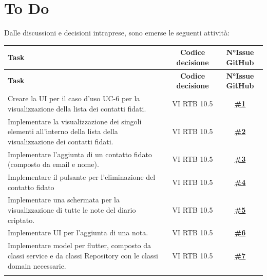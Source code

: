 \documentclass[a4paper,12pt]{article}
\newcommand{\ignoreglossary}{}
\begin{document}
\section{To Do}
Dalle discussioni e decisioni intraprese, sono emerse le seguenti attività:
\small
\renewcommand{\arraystretch}{1.2}
\begin{longtable}{|>{\raggedright\arraybackslash}p{}|c|c|}
\hline
\rowcolor{gray!60}
\textbf{Task} & \textbf{Codice decisione} & \textbf{N°Issue GitHub} \\
\hline
\endfirsthead
\hline
\rowcolor{gray!60}
\textbf{Task} & \textbf{Codice decisione} & \textbf{N°Issue GitHub} \\
\hline
\endhead
\endfoot
\hline
\endlastfoot
\rowcolor{white}
Creare la UI per il caso d'uso UC-6 per la visualizzazione della lista dei contatti fidati. & VI \ignoreglossary{RTB} 10.5 & \href{https://github.com/SWE-BitByBit/project-PoC/issues/1}{\textbf{\#1}} \\
\hline
\rowcolor{gray!20}
Implementare la visualizzazione dei singoli elementi all'interno della lista della visualizzazione dei contatti fidati. & VI \ignoreglossary{RTB} 10.5 & \href{https://github.com/SWE-BitByBit/project-PoC/issues/2}{\textbf{\#2}} \\
\hline
\rowcolor{white}
Implementare l'aggiunta di un contatto fidato (composto da email e nome). & VI \ignoreglossary{RTB} 10.5 & \href{https://github.com/SWE-BitByBit/project-PoC/issues/3}{\textbf{\#3}} \\
\hline
\rowcolor{gray!20}
Implementare il pulsante per l'eliminazione del contatto fidato & VI \ignoreglossary{RTB} 10.5 & \href{https://github.com/SWE-BitByBit/project-PoC/issues/4}{\textbf{\#4}} \\
\hline
\rowcolor{white}
Implementare una schermata per la visualizzazione di tutte le note del diario criptato. & VI \ignoreglossary{RTB} 10.5 & \href{https://github.com/SWE-BitByBit/project-PoC/issues/5}{\textbf{\#5}} \\
\hline
\rowcolor{gray!20}
Implementare UI per l'aggiunta di una nota. & VI \ignoreglossary{RTB} 10.5 & \href{https://github.com/SWE-BitByBit/project-PoC/issues/6}{\textbf{\#6}} \\
\hline
\rowcolor{white}
Implementare model per flutter, composto da classi service e da classi Repository con le classi domain necessarie. & VI \ignoreglossary{RTB} 10.5 & \href{https://github.com/SWE-BitByBit/project-PoC/issues/7}{\textbf{\#7}} \\
\hline
\rowcolor{gray!20}

\end{longtable}
\end{document}

